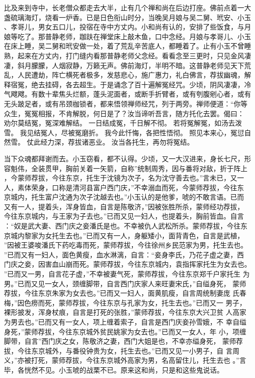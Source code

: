 比及来到寺中，长老僧众都走去大半，止有几个禅和尚在后边打座。佛前点着一大
盏硫璃海灯，烧看一炉香。已是日色衔山时分，当晚吴月娘与吴二舅、玳安、小玉
、孝哥儿，男女五口儿，投宿在寺中方丈内。小和尚有认的，安排了些饭食，与月
娘等吃了。那普静老师，跏趺在禅堂床上敲木鱼，口中念经。月娘与孝哥儿、小玉
在床上睡，吴二舅和玳安做一处，着了荒乱辛苦底人，都睡着了。止有小玉不曾睡
熟，起来在方丈内，打门缝内看那普静老师父念经。看看念至三更时，只见金风凄
凄，斜月朦朦，人烟寂静，万籁无声。佛前海灯，半明不暗。这普静老师见天下荒
乱，人民遭劫，阵亡横死者极多，发慈悲心，施广惠力，礼白佛言，荐拔幽魂，解
释宿冤，绝去挂碍，各去超生。于是诵念了百十遍解冤经咒。少顷，阴风凄凄，冷
气飕飕。有数十辈焦头烂额，蓬头泥面者，或断手折臂者，或有刳腹剜心者，或有
无头跛足者，或有吊颈枷锁者，都来悟领禅师经咒，列于两旁。禅师便道：“你等
众生，冤冤相报，不肯解脱，何日是了？汝当谛听吾言，随方托化去罢。偈曰：
劝尔莫结冤，冤深难解结。
一日结成冤，千日解不彻。
若将冤解冤，如汤去泼雪。
我见结冤人，尽被冤磨折。
我今此忏悔，各把性悟彻。
照见本来心，冤愆自然雪。
仗此经力深，荐拔诸恶业。
汝当各托生，再勿将冤结。

当下众魂都拜谢而去。小玉窃看，都不认得。少顷，又一大汉进来，身长七尺，形
容魁伟，全装贯甲，胸前关着一矢箭，自称”统制周秀，因与番将对敌，折于阵上
，今蒙师荐拔，今往东京，托生于沈镜为次子，名为沈守善去也。”言未已，又一
人，素体荣身，口称是清河县富户西门庆，”不幸溺血而死，今蒙师荐拔，今往东
京城内，托生富户沈通为次子沈越去也。”小玉认的是他爹，唬的不敢言语。已而
又有一人，提着头，浑身皆血，自言是陈敬济，”因被张胜所杀，蒙师经功荐拔，
今往东京城内，与王家为子去也。”已而又见一妇人，也提着头，胸前皆血。自言
：“奴是武大妻、西门庆之妾潘氏是也。不幸被仇人武松所杀。蒙师荐拔，今往东
京城内黎家为女托生去也。”已而又有一人，身躯矮小，面背青色，自言是武植，
”因被王婆唆潘氏下药吃毒而死，蒙师荐拔，今往徐州乡民范家为男，托生去也。
”已而又有一妇人，面色黄瘦，血水淋漓，自言：“妾身李氏，乃花子虚之妻，西
门庆之妾，因害血山崩而死。蒙师荐拔，今往东京城内，袁指挥家托生为女去也。
”已而又一男，自言花子虚，”不幸被妻气死，蒙师荐拔，今往东京郑千户家托生
为男。”已而又见一女人，颈缠脚带，自言西门庆家人来旺妻宋氏，”自缢身死，
蒙师荐拔，今往东京朱家为女去也。”已而又一妇人，面黄肌瘦，自言周统制妻庞
氏春梅，”因色痨而死，蒙师荐拔，今往东京与孔家为女，托生去也。”已而又一
男子，裸形披发，浑身杖痕，自言是打死的张胜，”蒙师荐拔，今往东京大兴卫贫
人高家为男去也。”已而又有一女人，项上缠着索子，自言是西门庆妾孙雪娥，不
幸自缢身死，”蒙师荐拔，今往东京城外贫民姚家为女去也。”已而又一女人，年
小，项缠脚带，自言”西门庆之女，陈敬济之妻，西门大姐是也，不幸亦缢身死，
蒙师荐拔，今往东京城外，与番役钟贵为女，托生去也。”已而又见一小男子，自
言周义，”亦被打死，蒙师荐拔，今往东京城外高家为男，名高留住儿，托生去也
。”言毕，各恍然不见。小玉唬的战栗不已。原来这和尚，只是和这些鬼说话。

